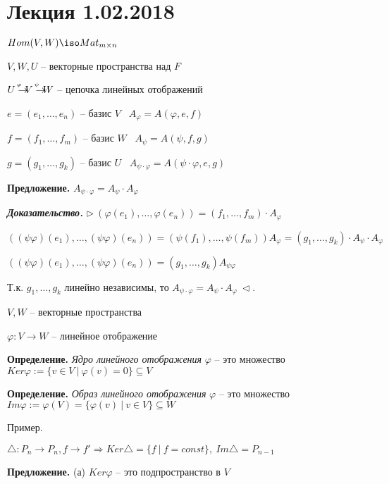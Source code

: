 \section{Лекция 1.02.2018}

$Hom(V, W) \iso Mat_{m \times n}$

$V, W, U$ -- векторные пространства над $F$

\bigskip
$U \rightarrow^{\hspace{-4mm}^{\varphi}} V \rightarrow^{\hspace{-4mm}^{\psi}} W$ -- цепочка линейных отображений

$e = (e_1, \dots, e_n)$ -- базис $V$ \ $A_{\varphi} = A(\varphi, e, f)$

$f = (f_1, \dots, f_m)$ -- базис $W$ \ $A_{\psi} = A(\psi, f, g)$

$g = (g_1, \dots, g_k)$ -- базис $U$ \ $A_{\psi \cdot \varphi} = A(\psi \cdot \varphi, e, g)$

\bigskip
\textbf{Предложение.} $A_{\psi \cdot \varphi} = A_{\psi} \cdot A_{\varphi}$

\bigskip
\textbf{\textit{Доказательство.}} $\rhd \ (\varphi(e_1), \dots, \varphi(e_n)) = (f_1, \dots, f_m) \cdot A_{\varphi}$

$((\psi \varphi) (e_1), \dots, (\psi \varphi) (e_n)) = (\psi(f_1), \dots, \psi(f_m)) A_{\varphi} = (g_1, \dots, g_k) \cdot A_{\psi} \cdot A_{\varphi}$

$((\psi \varphi) (e_1), \dots, (\psi \varphi) (e_n)) = (g_1, \dots, g_k) A_{\psi \varphi}$

Т.к. $g_1, \dots, g_k$ линейно независимы, то $A_{\psi \cdot \varphi} = A_{\psi} \cdot A_{\varphi} \ \lhd$.

\bigskip
$V, W$ -- векторные пространства

$\varphi: V \rightarrow W$ -- линейное отображение

\textbf{Определение.} \textit{Ядро линейного отображения} $\varphi$ -- это множество $Ker \varphi := \{v \in V \ | \ \varphi(v) = 0 \} \subseteq V$

\textbf{Определение.} \textit{Образ линейного отображения} $\varphi$ -- это множество $Im \varphi := \varphi(V) = \{\varphi(v) \ | \ v \in V\} \subseteq W$

\bigskip
Пример. 

$\triangle : P_n \rightarrow P_n, f \rightarrow f' \Rightarrow Ker \triangle = \{f \ | \ f = const \}, \ Im \triangle = P_{n-1}$

\bigskip
\textbf{Предложение.} (а) $Ker \varphi$ -- это подпространство в $V$

